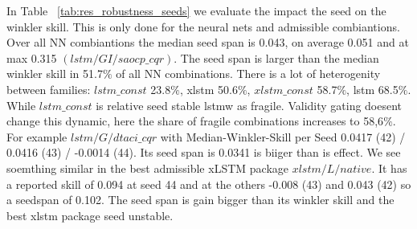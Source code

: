 In Table ~\ref{tab:res_robustness_seeds} we evaluate the impact the seed on the winkler skill. This is only done for the neural nets and admissible combiantions. Over all NN combiantions the median seed span is 0.043, on average 0.051 and at max 0.315  $(lstm/GI/saocp\_cqr)$. The seed span is larger than the median winkler skill in 51.7$\%$ of all NN combinations. There is a lot of heterogenity between families: $lstm\_const$ 23.8$\%$, xlstm 50.6$\%$, $xlstm\_const$ 58.7$\%$, lstm 68.5$\%$. While $lstm\_const$ is relative seed stable lstmw as fragile. Validity gating doesent change this dynamic, here the share of fragile combinations increases to 58,6$\%$. For example $lstm/G/dtaci\_cqr$ with Median-Winkler-Skill per Seed 0.0417 (42) / 0.0416 (43) / -0.0014 (44). Its seed span is 0.0341 is biiger than is effect. We see soemthing similar in the best admissible xLSTM package $xlstm/L/native$. It has a reported skill of 0.094 at seed 44 and at the others -0.008 (43) and 0.043 (42) so a seedspan of 0.102. The seed span is gain bigger than its winkler skill and the best xlstm package seed unstable. \\
